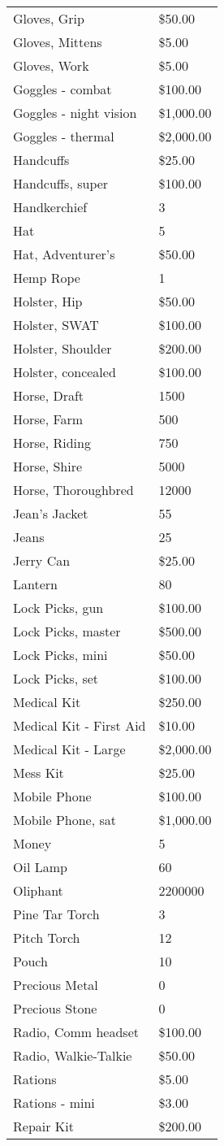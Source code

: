 \documentclass[twoside]{book}
\begin{document}
\begin{longtable}{p{1.25in}l}
      \raggedright Gloves, Grip&\$50.00\tabularnewline
      \raggedright Gloves, Mittens&\$5.00\tabularnewline
      \raggedright Gloves, Work&\$5.00\tabularnewline
      \raggedright Goggles - combat&\$100.00\tabularnewline
      \raggedright Goggles - night vision&\$1,000.00\tabularnewline
      \raggedright Goggles - thermal&\$2,000.00\tabularnewline
      \raggedright Handcuffs&\$25.00\tabularnewline
      \raggedright Handcuffs, super&\$100.00\tabularnewline
      \raggedright Handkerchief&3\tabularnewline
      \raggedright Hat&5\tabularnewline
      \raggedright Hat, Adventurer's&\$50.00\tabularnewline
      \raggedright Hemp Rope&1\tabularnewline
      \raggedright Holster, Hip&\$50.00\tabularnewline
      \raggedright Holster, SWAT&\$100.00\tabularnewline
      \raggedright Holster, Shoulder&\$200.00\tabularnewline
      \raggedright Holster, concealed&\$100.00\tabularnewline
      \raggedright Horse, Draft&1500\tabularnewline
      \raggedright Horse, Farm&500\tabularnewline
      \raggedright Horse, Riding&750\tabularnewline
      \raggedright Horse, Shire&5000\tabularnewline
      \raggedright Horse, Thoroughbred&12000\tabularnewline
      \raggedright Jean's Jacket&55\tabularnewline
      \raggedright Jeans&25\tabularnewline
      \raggedright Jerry Can&\$25.00\tabularnewline
      \raggedright Lantern&80\tabularnewline
      \raggedright Lock Picks, gun&\$100.00\tabularnewline
      \raggedright Lock Picks, master&\$500.00\tabularnewline
      \raggedright Lock Picks, mini&\$50.00\tabularnewline
      \raggedright Lock Picks, set&\$100.00\tabularnewline
      \raggedright Medical Kit&\$250.00\tabularnewline
      \raggedright Medical Kit - First Aid&\$10.00\tabularnewline
      \raggedright Medical Kit - Large&\$2,000.00\tabularnewline
      \raggedright Mess Kit&\$25.00\tabularnewline
      \raggedright Mobile Phone&\$100.00\tabularnewline
      \raggedright Mobile Phone, sat&\$1,000.00\tabularnewline
      \raggedright Money&5\tabularnewline
      \raggedright Oil Lamp&60\tabularnewline
      \raggedright Oliphant&2200000\tabularnewline
      \raggedright Pine Tar Torch&3\tabularnewline
      \raggedright Pitch Torch&12\tabularnewline
      \raggedright Pouch&10\tabularnewline
      \raggedright Precious Metal&0\tabularnewline
      \raggedright Precious Stone&0\tabularnewline
      \raggedright Radio, Comm headset&\$100.00\tabularnewline
      \raggedright Radio, Walkie-Talkie&\$50.00\tabularnewline
      \raggedright Rations&\$5.00\tabularnewline
      \raggedright Rations - mini&\$3.00\tabularnewline
      \raggedright Repair Kit&\$200.00\tabularnewline

\end{longtable}
\end{document}
